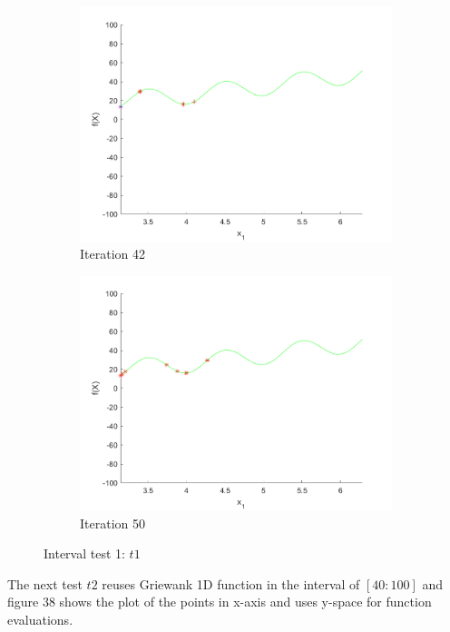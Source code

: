 \begin{figure}
\begin{subfigure}[b]{0.4\textwidth}
   \includegraphics[width=\textwidth]{img/smpl/rast1dshft/loa-iter-42}
   \caption{Iteration 42}
   \label{fig:i1-iter-6}
 \end{subfigure}
 \begin{subfigure}[b]{0.4\textwidth}
   \includegraphics[width=\textwidth]{img/smpl/rast1dshft/loa-iter-50}
   \caption{Iteration 50}
   \label{fig:i1-iter-7}
 \end{subfigure}
 \caption{Interval test 1: $t1$}
\end{figure}

\par The next test $t2$ reuses Griewank 1D function in the interval of $[40:100]$ and figure 38 shows the plot of the points in x-axis and uses y-space for function evaluations.

